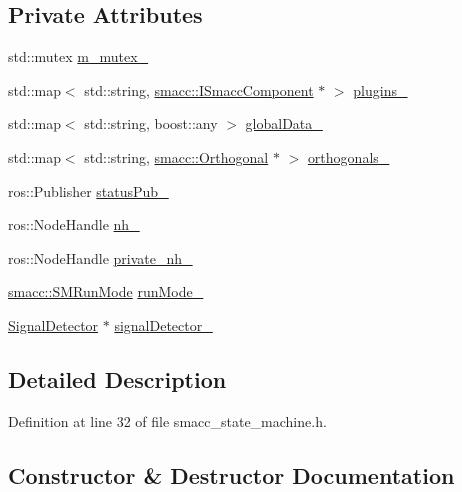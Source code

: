 \subsection*{Private Attributes}
\begin{DoxyCompactItemize}
\item 
std\+::mutex \hyperlink{classsmacc_1_1ISmaccStateMachine_a0eecb19258e0ec026029c7755dbb94d7}{m\+\_\+mutex\+\_\+}
\item 
std\+::map$<$ std\+::string, \hyperlink{classsmacc_1_1ISmaccComponent}{smacc\+::\+I\+Smacc\+Component} $\ast$ $>$ \hyperlink{classsmacc_1_1ISmaccStateMachine_aaf2f1f4dec865e5b6a92a6fb231f204f}{plugins\+\_\+}
\item 
std\+::map$<$ std\+::string, boost\+::any $>$ \hyperlink{classsmacc_1_1ISmaccStateMachine_a4af5edfc2584f74409ca194d2d869fac}{global\+Data\+\_\+}
\item 
std\+::map$<$ std\+::string, \hyperlink{classsmacc_1_1Orthogonal}{smacc\+::\+Orthogonal} $\ast$ $>$ \hyperlink{classsmacc_1_1ISmaccStateMachine_a919af0d70a7583a7440b02f387f7faa5}{orthogonals\+\_\+}
\item 
ros\+::\+Publisher \hyperlink{classsmacc_1_1ISmaccStateMachine_a7360ef485d5c83a3811dfe3eaa3a0c20}{status\+Pub\+\_\+}
\item 
ros\+::\+Node\+Handle \hyperlink{classsmacc_1_1ISmaccStateMachine_ad8877bcca9dbb345fe72cca839c93dd3}{nh\+\_\+}
\item 
ros\+::\+Node\+Handle \hyperlink{classsmacc_1_1ISmaccStateMachine_a9c6a5c647ecca6599589c12fdcd53bfc}{private\+\_\+nh\+\_\+}
\item 
\hyperlink{namespacesmacc_a3e4f79486ea6ea6342dd3c712d16a4f6}{smacc\+::\+S\+M\+Run\+Mode} \hyperlink{classsmacc_1_1ISmaccStateMachine_a9f8cfbf577f7ae7a48b7a328e2e6b589}{run\+Mode\+\_\+}
\item 
\hyperlink{classsmacc_1_1SignalDetector}{Signal\+Detector} $\ast$ \hyperlink{classsmacc_1_1ISmaccStateMachine_a3982eb671f5f001cb047d3a467789986}{signal\+Detector\+\_\+}
\end{DoxyCompactItemize}


\subsection{Detailed Description}


Definition at line 32 of file smacc\+\_\+state\+\_\+machine.\+h.



\subsection{Constructor \& Destructor Documentation}
